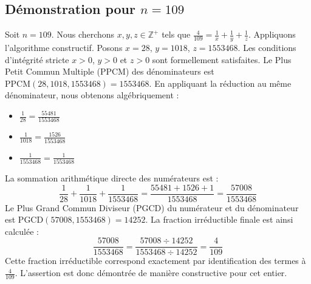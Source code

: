 \documentclass[11pt,a4paper]{article}
\begin{document}
\subsection{Démonstration pour $n = 109$}
Soit $n = 109$. Nous cherchons $x, y, z \in \mathbb{Z}^{+}$ tels que $\frac{4}{109} = \frac{1}{x} + \frac{1}{y} + \frac{1}{z}$.
Appliquons l'algorithme constructif. Posons $x = 28$, $y = 1018$, $z = 1553468$.
Les conditions d'intégrité stricte $x > 0$, $y > 0$ et $z > 0$ sont formellement satisfaites.
Le Plus Petit Commun Multiple (PPCM) des dénominateurs est $\text{PPCM}(28, 1018, 1553468) = 1553468$.
En appliquant la réduction au même dénominateur, nous obtenons algébriquement :
\begin{itemize}
    \item $\frac{1}{28} = \frac{55481}{1553468}$
    \item $\frac{1}{1018} = \frac{1526}{1553468}$
    \item $\frac{1}{1553468} = \frac{1}{1553468}$
\end{itemize}
La sommation arithmétique directe des numérateurs est :
$$ \frac{1}{28} + \frac{1}{1018} + \frac{1}{1553468} = \frac{55481 + 1526 + 1}{1553468} = \frac{57008}{1553468} $$
Le Plus Grand Commun Diviseur (PGCD) du numérateur et du dénominateur est $\text{PGCD}(57008, 1553468) = 14252$.
La fraction irréductible finale est ainsi calculée :
$$ \frac{57008}{1553468} = \frac{57008 \div 14252}{1553468 \div 14252} = \frac{4}{109} $$
Cette fraction irréductible correspond exactement par identification des termes à $\frac{4}{109}$. L'assertion est donc démontrée de manière constructive pour cet entier.
\end{document}
